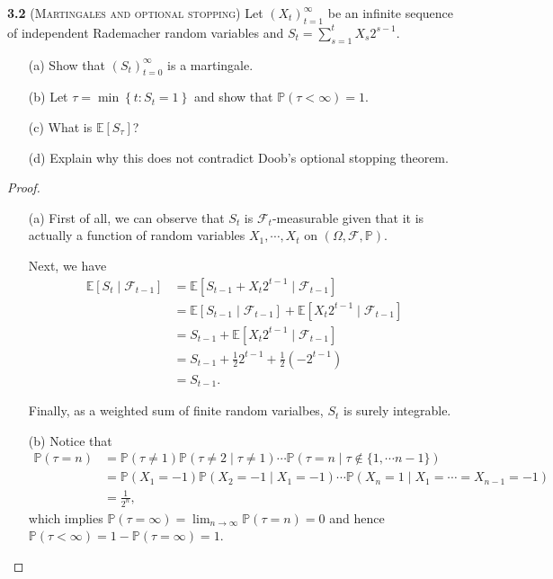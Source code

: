\noindent\textbf{3.2}
(\textsc{Martingales and optional stopping}) Let $\left(X_{t}\right)_{t=1}^{\infty}$ be an infinite sequence of independent
Rademacher random variables and $S_{t}=\sum_{s=1}^{t} X_{s} 2^{s-1}$.
\begin{enumerate}
    \item[(a)] Show that $\left(S_{t}\right)_{t=0}^{\infty}$ is a martingale.
    \item[(b)] Let $\tau=\min \left\{t: S_{t}=1\right\}$ and show that $\mathbb{P}(\tau<\infty)=1$. 
    \item[(c)] What is $\mathbb{E}\left[S_{\tau}\right]$?
    \item[(d)] Explain why this does not contradict Doob's optional stopping theorem. 
\end{enumerate}

\begin{proof}
    \begin{enumerate}
        \item[(a)] First of all, we can observe that $S_t$ is $\mathcal{F}_{t}$-measurable given that it is actually a function of random variables $X_1, \cdots, X_t$ on $(\Omega, \mathcal{F}, \mathbb{P})$.
        
        Next, we have
        \begin{equation*}
            \begin{aligned}
                \mathbb{E}\left[S_{t} \mid \mathcal{F}_{t-1}\right] 
                &= \mathbb{E}\left[S_{t-1} + X_t 2^{t-1}\mid \mathcal{F}_{t-1}\right]\\
                &= \mathbb{E}\left[S_{t-1} \mid \mathcal{F}_{t-1}\right] + \mathbb{E}\left[X_t 2^{t-1} \mid \mathcal{F}_{t-1}\right]\\
                &= S_{t-1} + \mathbb{E}\left[X_t 2^{t-1} \mid \mathcal{F}_{t-1}\right]\\
                &= S_{t-1} + \frac{1}{2} 2^{t-1} + \frac{1}{2} (-2^{t-1})\\
                &= S_{t-1}.
            \end{aligned}
        \end{equation*}

        Finally, as a weighted sum of finite random varialbes, $S_t$ is surely integrable.

        \item[(b)] Notice that 
        \begin{equation*}
            \begin{aligned}
                \mathbb{P}(\tau = n) 
                &= \mathbb{P}(\tau \neq 1) \mathbb{P}(\tau \neq 2 \mid \tau \neq 1) \cdots \mathbb{P}(\tau = n \mid \tau \notin \{1, \cdots n - 1\})\\
                &= \mathbb{P}(X_1 = -1) \mathbb{P}(X_2 = -1 \mid X_1 = -1) \cdots \mathbb{P}(X_n = 1 \mid X_1 = \cdots = X_{n-1} = -1)\\
                &= \frac{1}{2^n},
            \end{aligned}
        \end{equation*}
        which implies $\mathbb{P}(\tau = \infty) = \lim_{n \rightarrow \infty} \mathbb{P}(\tau = n) = 0$ and hence $\mathbb{P}(\tau < \infty) = 1 - \mathbb{P}(\tau = \infty) = 1$.


\end{enumerate}
\end{proof}
